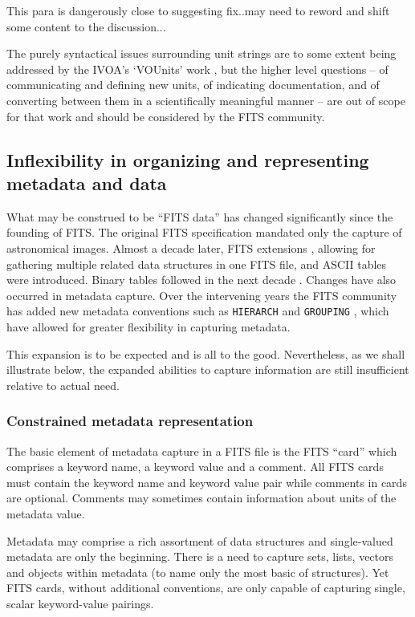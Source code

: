 \documentclass[final,authoryear,5p,times,twocolumn]{elsarticle}
\begin{document}
{{{\color{ref} This para is dangerously close to suggesting fix..may need 
to reword and shift some content to the discussion...

The purely syntactical issues surrounding unit strings are to some
extent being addressed by the IVOA's `VOUnits' work \citep{VOUnits}, but the higher
level questions -- of communicating and defining new units, of
indicating documentation, and of converting between them in a
scientifically meaningful manner -- are out of scope for that work and
should be considered by the FITS community.
}


\subsection{Inflexibility in organizing and representing metadata and data}
\label{section_inflex_represent}


What may be construed to be ``FITS data'' has changed significantly
since the founding of FITS. The original FITS specification mandated
only the capture of astronomical images. Almost a decade later, FITS
extensions \citep{1988A&AS...73..359G}, allowing for gathering
multiple related data structures in one FITS file, and ASCII tables
\citep{1988A&AS...73..365H} were introduced. Binary tables followed in
the next decade \citep{1995A&AS..113..159C}. Changes have also
occurred in metadata capture. Over the intervening years the FITS
community has added new metadata conventions such as \texttt{HIERARCH}
\citep{2009Wic} and \texttt{GROUPING} \citep{2007Jen}, which have
allowed for greater flexibility in capturing metadata.


This expansion is to be expected and is all to the good. Nevertheless,
as we shall illustrate below, the expanded abilities to capture
information are still insufficient relative to actual need.


\subsubsection{Constrained metadata representation}


The basic element of metadata capture in a FITS file is the FITS
``card'' which comprises a keyword name, a keyword value and a
comment. All FITS cards must contain the keyword name and keyword
value pair while comments in cards are optional. Comments may
sometimes contain information about units of the metadata value.

Metadata may comprise a rich assortment of data structures and
single-valued metadata are only the beginning. There is a need to
capture sets, lists, vectors and objects within metadata (to name only
the most basic of structures). Yet FITS cards, without additional
conventions, are only capable of capturing single, scalar keyword-value 
pairings. 

}}
\end{document}

